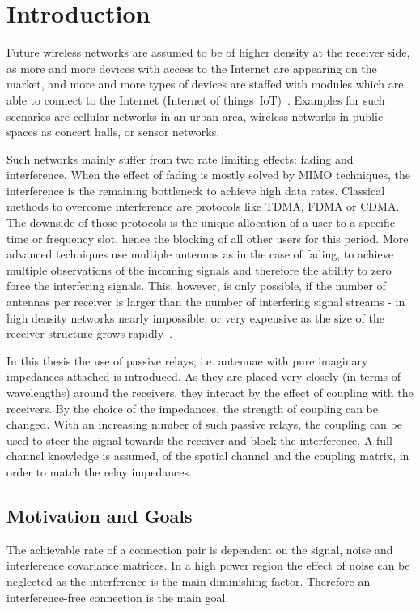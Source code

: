 \chapter{Introduction}
\label{sec:introduction}

Future wireless networks are assumed to be of higher density at the receiver side, as more and more devices with access to the Internet are appearing on the market, and more and more types of devices are staffed with modules which are able to connect to the Internet (Internet of things~IoT)~\cite{rusek13}.
Examples for such scenarios are cellular networks in an urban area, wireless networks in public spaces as concert halls, or sensor networks.

Such networks mainly suffer from two rate limiting  effects: fading and interference.
When the effect of fading is mostly solved by MIMO techniques, the interference is the remaining bottleneck to achieve high data rates.
Classical methods to overcome interference are protocols like TDMA, FDMA or CDMA.
The downside of those protocols is the unique allocation of a user to a specific time or frequency slot, hence the blocking of all other users for this period.
More advanced techniques use multiple antennas as in the case of fading, to achieve multiple observations of the incoming signals and therefore the ability to zero force the interfering signals.
This, however, is only possible, if the number of antennas per receiver is larger than the number of interfering signal streams - in high density networks nearly impossible, or very expensive as the size of the receiver structure grows rapidly~\cite{rusek13}.

In this thesis the use of passive relays, i.e. antennae with pure imaginary impedances attached is introduced.
As they are placed very closely (in terms of wavelengths) around the receivers, they interact by the effect of coupling with the receivers.
By the choice of the impedances, the strength of coupling can be changed.
With an increasing number of such passive relays, the coupling can be used to steer the signal towards the receiver and block the interference.
A full channel knowledge is assumed, of the spatial channel and the coupling matrix, in order to match the relay impedances.

\section{Motivation and Goals}
\label{sec:motivation}

The achievable rate of a connection pair is dependent on the signal, noise and interference covariance matrices.
In a high power region the effect of noise can be neglected as the interference is the main diminishing factor.
Therefore an interference-free connection is the main goal.

